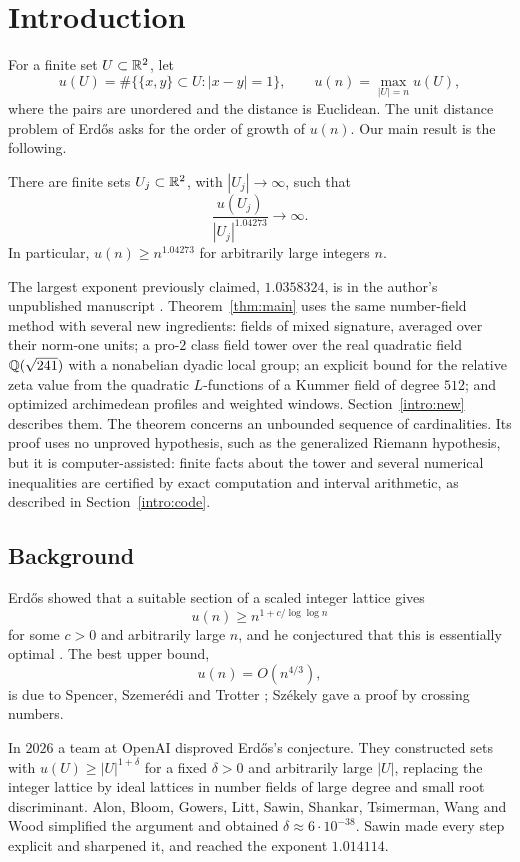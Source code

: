 \section{Introduction}\label{intro:section}
For a finite set $U\subset\mathbb R^2$, let
\[
 u(U)=\#\{\{x,y\}\subset U:|x-y|=1\},\qquad
 u(n)=\max_{|U|=n}u(U),
\]
where the pairs are unordered and the distance is Euclidean. The unit
distance problem of Erd\H{o}s \cite{Erdos1946} asks for the order of
growth of $u(n)$. Our main result is the following.

\begin{theorem}\label{thm:main}
There are finite sets $U_j\subset\mathbb R^2$, with $|U_j|\to\infty$, such that
\[
 \frac{u(U_j)}{|U_j|^{1.04273}}\longrightarrow\infty.
\]
In particular, $u(n)\ge n^{1.04273}$ for arbitrarily large integers $n$.
\end{theorem}

The largest exponent previously claimed, $1.0358324$, is in the author's
unpublished manuscript \cite{Naslund0358}. Theorem~\ref{thm:main} uses
the same number-field method with several new ingredients: fields of
mixed signature, averaged over their norm-one units; a
pro-$2$ class field tower over the real quadratic field $\mathbb Q(\sqrt{241})$
with a nonabelian dyadic local group; an explicit bound for the relative
zeta value from the quadratic $L$-functions of a Kummer field of degree
$512$; and optimized archimedean profiles and weighted windows.
Section~\ref{intro:new} describes them. The theorem concerns an unbounded
sequence of cardinalities. Its proof uses no unproved hypothesis, such
as the generalized Riemann hypothesis, but it is computer-assisted:
finite facts about the tower and several numerical inequalities are
certified by exact computation and interval arithmetic, as described in
Section~\ref{intro:code}.

\subsection{Background}\label{intro:background}
Erd\H{o}s \cite{Erdos1946} showed that a suitable section of a scaled
integer lattice gives
\[
 u(n)\ge n^{1+c/\log\log n}
\]
for some $c>0$ and arbitrarily large $n$, and he conjectured that this is
essentially optimal \cite{Erdos1946,Erdos1994}. The best upper bound,
\[
 u(n)=O(n^{4/3}),
\]
is due to Spencer, Szemer\'edi and Trotter
\cite{SpencerSzemerediTrotter1984}; Sz\'ekely \cite{Szekely1997} gave a
proof by crossing numbers.

In $2026$ a team at OpenAI \cite{OpenAI2026} disproved Erd\H{o}s's
conjecture. They constructed sets with $u(U)\ge|U|^{1+\delta}$ for a
fixed $\delta>0$ and arbitrarily large $|U|$, replacing the integer
lattice by ideal lattices in number fields of large degree and small
root discriminant. Alon, Bloom, Gowers, Litt, Sawin, Shankar, Tsimerman,
Wang and Wood \cite{Alon2026} simplified the argument and obtained
$\delta\approx6\cdot10^{-38}$. Sawin \cite{Sawin2026} made every step
explicit and sharpened it, and reached the exponent $1.014114$.

